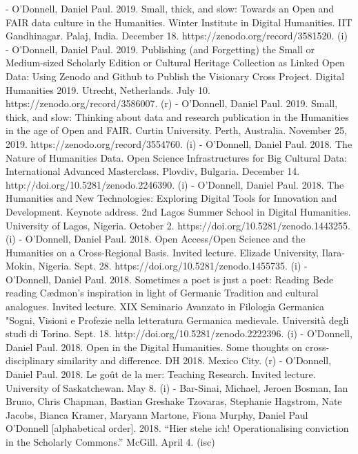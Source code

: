 - O’Donnell, Daniel Paul. 2019. Small, thick, and slow: Towards an Open and FAIR data culture in the Humanities. Winter Institute in Digital Humanities. IIT Gandhinagar. Palaj, India. December 18. https:/\allowbreak{}/\allowbreak{}zenodo.org/\allowbreak{}record/\allowbreak{}3581520. (i)
- O’Donnell, Daniel Paul. 2019. Publishing (and Forgetting) the Small or Medium-sized Scholarly Edition or Cultural Heritage Collection as Linked Open Data: Using Zenodo and Github to Publish the Visionary Cross Project. Digital Humanities 2019. Utrecht, Netherlands. July 10. https:/\allowbreak{}/\allowbreak{}zenodo.org/\allowbreak{}record/\allowbreak{}3586007. (r)
- O’Donnell, Daniel Paul. 2019. Small, thick, and slow: Thinking about data and research publication in the Humanities in the age of Open and FAIR. Curtin University. Perth, Australia. November 25, 2019. https:/\allowbreak{}/\allowbreak{}zenodo.org/\allowbreak{}record/\allowbreak{}3554760. (i)
- O’Donnell, Daniel Paul. 2018. The Nature of Humanities Data. Open Science Infrastructures for Big Cultural Data: International Advanced Masterclass. Plovdiv, Bulgaria. December 14. http:/\allowbreak{}/\allowbreak{}doi.org/\allowbreak{}10.5281/\allowbreak{}zenodo.2246390. (i)
- O’Donnell, Daniel Paul. 2018. The Humanities and New Technologies: Exploring Digital Tools for Innovation and Development. Keynote address. 2nd Lagos Summer School in Digital Humanities. University of Lagos, Nigeria. October 2. https:/\allowbreak{}/\allowbreak{}doi.org/\allowbreak{}10.5281/\allowbreak{}zenodo.1443255. (i)
- O’Donnell, Daniel Paul. 2018. Open Access/\allowbreak{}Open Science and the Humanities on a Cross-Regional Basis. Invited lecture. Elizade University, Ilara-Mokin, Nigeria. Sept. 28. https:/\allowbreak{}/\allowbreak{}doi.org/\allowbreak{}10.5281/\allowbreak{}zenodo.1455735. (i)
- O’Donnell, Daniel Paul. 2018. Sometimes a poet is just a poet: Reading Bede reading Cædmon’s inspiration in light of Germanic Tradition and cultural analogues. Invited lecture. XIX Seminario Avanzato in Filologia Germanica "Sogni, Visioni e Profezie nella letteratura Germanica medievale. Università degli studi di Torino. Sept. 18. http:/\allowbreak{}/\allowbreak{}doi.org/\allowbreak{}10.5281/\allowbreak{}zenodo.2222396. (i)
- O’Donnell, Daniel Paul. 2018. Open in the Digital Humanities. Some thoughts on cross-disciplinary similarity and difference. DH 2018. Mexico City. (r)
- O’Donnell, Daniel Paul. 2018. Le goût de la mer: Teaching Research. Invited lecture. University of Saskatchewan. May 8. (i)
- Bar-Sinai, Michael, Jeroen Bosman, Ian Bruno, Chris Chapman, Bastian Greshake Tzovaras, Stephanie Hagstrom, Nate Jacobs\*, Bianca Kramer, Maryann Martone, Fiona Murphy, Daniel Paul O'Donnell [alphabetical order]. 2018. “Hier stehe ich! Operationalising conviction in the Scholarly Commons.” McGill. April 4. (isc)
